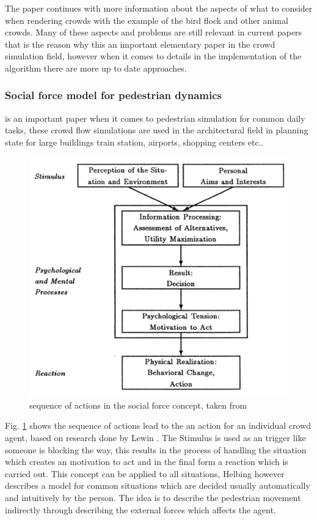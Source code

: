 \documentclass[sigconf]{acmart}
\begin{document}
The paper continues with more information about the aspects of what to consider when rendering crowds with the example of the bird flock and other animal crowds. Many of these aspects and problems are still relevant in current papers that is the reason why this an important elementary paper in the crowd simulation field, however when it comes to details in the implementation of the algorithm there are more up to date approaches. 

\subsubsection{Social force model for pedestrian dynamics}\cite{helbing_social_1995} is an important paper when it comes to pedestrian simulation for common daily tasks, these crowd flow simulations are used in the architectural field in planning state for large buildings train station, airports, shopping centers etc.. 
\begin{figure}[h]
  \centering
  \includegraphics[width=1\linewidth]{images/helbingSocialForceConceptScheme.png}
  \caption{sequence of actions in the social force concept, taken from \cite{helbing_social_1995}}
  \label{fig:helbingSchema}
\end{figure}
Fig. \ref{fig:helbingSchema} shows the sequence of actions lead to the an action for an individual crowd agent, based on research done by Lewin \cite{lewin_field_1951}. The Stimulus is used as an trigger like someone is blocking the way, this results in the process of handling the situation which creates an motivation to act and in the final form a reaction which is carried out. This concept can be applied to all situations, Helbing however describes a model for common situations which are decided usually automatically and intuitively by the person. The idea is to describe the pedestrian movement indirectly through describing the external forces which affects the agent. 
\end{document}
